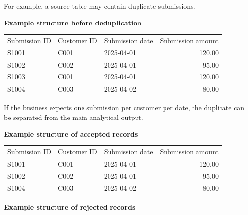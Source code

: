\documentclass[10pt,openany,10pt]{book}
\newcounter{none}
\let\podeToprule\toprule
\let\podeMidrule\midrule
\let\podeBottomrule\bottomrule
\renewcommand{\toprule}{\arrayrulecolor{pbiGrid}\podeToprule}
\renewcommand{\midrule}{\arrayrulecolor{pbiGrid}\podeMidrule}
\renewcommand{\bottomrule}{\arrayrulecolor{pbiGrid}\podeBottomrule}
\begin{document}
For example, a source table may contain duplicate submissions.

\textbf{Example structure before deduplication}

{\def\LTcaptype{none} %
\begin{longtable}[]{@{}lllr@{}}
\toprule\noalign{}
Submission ID & Customer ID & Submission date & Submission amount \\
\midrule\noalign{}
\endhead
\bottomrule\noalign{}
\endlastfoot
S1001 & C001 & 2025-04-01 & 120.00 \\
S1002 & C002 & 2025-04-01 & 95.00 \\
S1003 & C001 & 2025-04-01 & 120.00 \\
S1004 & C003 & 2025-04-02 & 80.00 \\
\end{longtable}
}

If the business expects one submission per customer per date, the
duplicate can be separated from the main analytical output.

\textbf{Example structure of accepted records}

{\def\LTcaptype{none} %
\begin{longtable}[]{@{}lllr@{}}
\toprule\noalign{}
Submission ID & Customer ID & Submission date & Submission amount \\
\midrule\noalign{}
\endhead
\bottomrule\noalign{}
\endlastfoot
S1001 & C001 & 2025-04-01 & 120.00 \\
S1002 & C002 & 2025-04-01 & 95.00 \\
S1004 & C003 & 2025-04-02 & 80.00 \\
\end{longtable}
}

\textbf{Example structure of rejected records}
\end{document}
